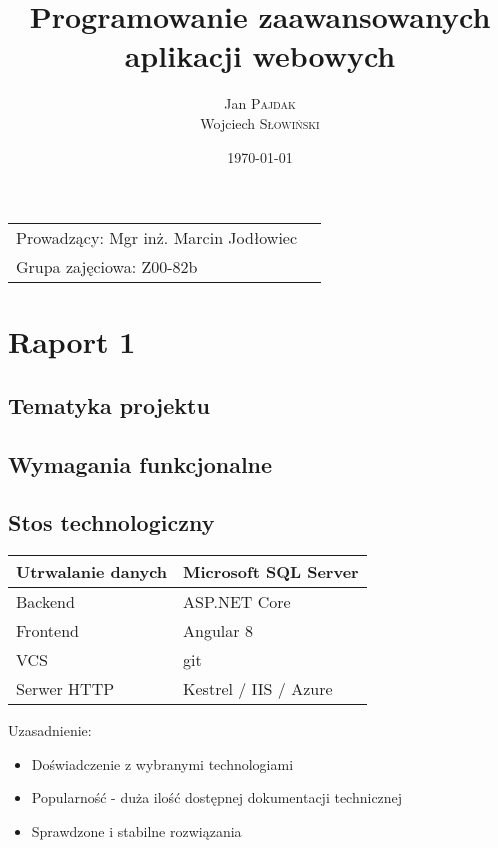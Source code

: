 \documentclass{article}
\title{Programowanie zaawansowanych aplikacji webowych}
\author{Jan \textsc{Pajdak} \\ Wojciech \textsc{Słowiński}}
\date{\today}
\begin{document}
\maketitle
\begin{center}
\begin{tabular}{l r}
Prowadzący: Mgr inż. Marcin Jodłowiec &  \\
Grupa zajęciowa: Z00-82b &
\end{tabular}
\end{center}
\tableofcontents

%
%
\newpage
\section{Raport 1}
\subsection{Tematyka projektu}
\subsection{Wymagania funkcjonalne}
\subsection{Stos technologiczny}
\begin{table}[]
    \begin{tabular}{|l|l|}
        \hline
        Utrwalanie danych & Microsoft SQL Server  \\ \hline
        Backend           & ASP.NET Core          \\ \hline
        Frontend          & Angular 8             \\ \hline
        VCS               & git                   \\ \hline
        Serwer HTTP       & Kestrel / IIS / Azure \\ \hline
    \end{tabular}
\end{table}
Uzasadnienie:
\begin{itemize}
    \item Doświadczenie z wybranymi technologiami
    \item Popularność - duża ilość dostępnej dokumentacji technicznej
    \item Sprawdzone i stabilne rozwiązania
\end{itemize}

\end{document}
